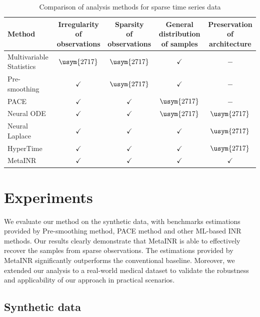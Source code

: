 \documentclass{article}
\newcommand{\xmark}{\usym{2717}}
\begin{document}
\begin{table}[htb]
  \centering
\begin{tabular}{lcccc}
  \hline 
  Method & \thead{Irregularity\\of observations} & \thead{Sparsity \\of observations} & \thead{General distribution \\ of samples} & \thead{Preservation \\ of architecture} \\
  \hline  
  Multivariable Statistics& $\xmark$ & $\xmark$ & $\checkmark$ & $-$\\
  Pre-smoothing & $\checkmark$ & $\xmark$ & $\checkmark$ & $-$\\
  PACE \cite{yao2005functional} & $\checkmark$ & $\checkmark$ & $\xmark$& $-$  \\
  Neural ODE \cite{chen2018neural} & $\checkmark$ & $\checkmark$ & $\xmark$ & $\xmark$ \\
  Neural Laplace \cite{holt2022neural} & $\checkmark$ & $\checkmark$ & $\checkmark$ & $\xmark$ \\
  HyperTime \cite{fons2022hypertime} & $\checkmark$ & $\checkmark$ & $\checkmark$ & $\xmark$ \\
  MetaINR & $\checkmark$ & $\checkmark$ &$\checkmark$ & $\checkmark$\\
 \hline
\end{tabular}
\caption{Comparison of analysis methods for sparse time series data}
\label{method_compare}
\end{table}




\section{Experiments}
We evaluate our method on the synthetic data, with benchmarks estimations provided by Pre-smoothing method, PACE method and other ML-based INR methods.
Our results clearly demonstrate that MetaINR is able to effectively recover the samples from sparse observations. The estimations provided by MetaINR significantly outperforms the conventional baseline. 
Moreover, we extended our analysis to a real-world medical dataset to validate the robustness and applicability of our approach in practical scenarios.
\subsection{Synthetic data}
\end{document}
